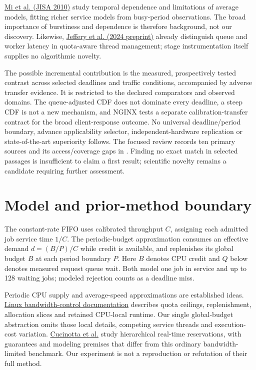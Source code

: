 \documentclass[11pt,a4paper]{article}
\begin{document}
\href{https://link.springer.com/content/pdf/10.1007/s13174-010-0012-9.pdf}{Mi et al. (JISA 2010)}
study temporal dependence and limitations of average models, fitting richer
service models from busy-period observations. The broad importance of
burstiness and dependence is therefore background, not our discovery.
Likewise, \href{https://arxiv.org/html/2407.11582v1}{Jeffery et al. (2024 preprint)}
already distinguish queue and worker latency in quota-aware thread management;
stage instrumentation itself supplies no algorithmic novelty.

The possible incremental contribution is the measured, prospectively tested
contrast across selected deadlines and traffic conditions, accompanied by
adverse transfer evidence. It is restricted to the declared comparators and
observed domains. The queue-adjusted CDF does not dominate every deadline,
a steep CDF is not a new mechanism, and NGINX tests a separate calibration-transfer
contract for the broad client-response outcome.
No universal deadline/period boundary, advance applicability selector,
independent-hardware replication or state-of-the-art superiority follows.
The focused review records ten primary sources and its access/coverage gaps
in .
Finding no exact match in selected passages is insufficient to claim a first
result; scientific novelty remains a candidate requiring further assessment.

\section{Model and prior-method boundary}

The constant-rate FIFO uses calibrated throughput $C$, assigning each admitted
job service time $1/C$. The periodic-budget approximation consumes an effective
demand $d = (B/P)/C$ while credit is available, and replenishes its global budget
$B$ at each period boundary $P$. Here $B$ denotes CPU credit and $Q$ below denotes
measured request queue wait. Both model one job in service and up to 128 waiting
jobs; modeled rejection counts as a deadline miss.

Periodic CPU supply and average-speed approximations are established ideas.
\href{https://docs.kernel.org/scheduler/sched-bwc.html}{Linux bandwidth-control documentation}
describes quota ceilings, replenishment, allocation slices and retained
CPU-local runtime. Our single global-budget abstraction omits those local
details, competing service threads and execution-cost variation.
\href{https://retis.santannapisa.it/people/nino/publication/TCC23.pdf}{Cucinotta et al.}
study hierarchical real-time reservations, with guarantees and modeling
premises that differ from this ordinary bandwidth-limited benchmark. Our
experiment is not a reproduction or refutation of their full method.
\end{document}
